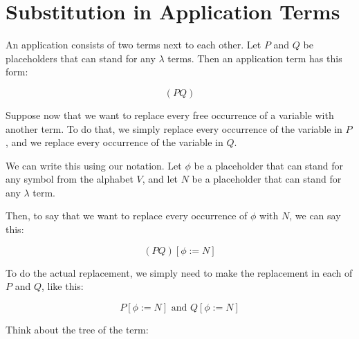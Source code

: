 \documentclass{book}
\numberwithin{equation}{chapter}
\begin{document}
\chapter{Substitution in Application Terms}

An application consists of two terms next to each other. Let $P$ and $Q$ be placeholders that can stand for any $\lambda$ terms. Then an application term has this form:

\begin{equation}
(P Q)
\end{equation}

\noindent
Suppose now that we want to replace every free occurrence of a variable with another term. To do that, we simply replace every occurrence of the variable in $P$, and we replace every occurrence of the variable in $Q$.

We can write this using our notation. Let $\phi$ be a placeholder that can stand for any symbol from the alphabet $V$, and let $N$ be a placeholder that can stand for any $\lambda$ term. 

Then, to say that we want to replace every occurrence of $\phi$ with $N$, we can say this:

\begin{equation}
(P Q)[\phi := N]
\end{equation}

\noindent
To do the actual replacement, we simply need to make the replacement in each of $P$ and $Q$, like this:

\begin{equation}
P[\phi := N] \text{ and } Q[\phi := N]
\end{equation}

\noindent
Think about the tree of the term:

\begin{center}
\end{center}
\end{document}
